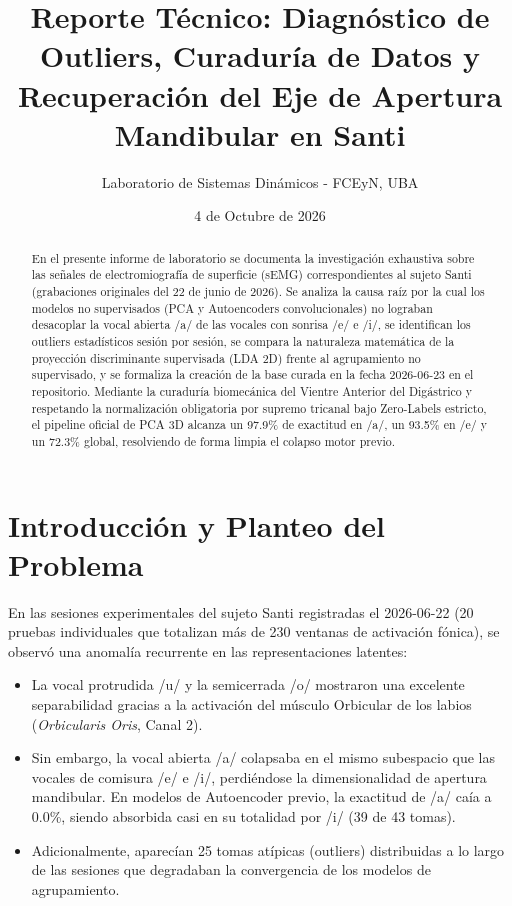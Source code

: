 \documentclass[11pt,a4paper]{article}
\title{\textbf{Reporte Técnico: Diagnóstico de Outliers, Curaduría de Datos y Recuperación del Eje de Apertura Mandibular en Santi}}
\author{Laboratorio de Sistemas Dinámicos - FCEyN, UBA}
\date{4 de Octubre de 2026}
\begin{document}
\maketitle

\begin{abstract}
En el presente informe de laboratorio se documenta la investigación exhaustiva sobre las señales de electromiografía de superficie (sEMG) correspondientes al sujeto Santi (grabaciones originales del 22 de junio de 2026). Se analiza la causa raíz por la cual los modelos no supervisados (PCA y Autoencoders convolucionales) no lograban desacoplar la vocal abierta /a/ de las vocales con sonrisa /e/ e /i/, se identifican los outliers estadísticos sesión por sesión, se compara la naturaleza matemática de la proyección discriminante supervisada (LDA 2D) frente al agrupamiento no supervisado, y se formaliza la creación de la base curada en la fecha 2026-06-23 en el repositorio. Mediante la curaduría biomecánica del Vientre Anterior del Digástrico y respetando la normalización obligatoria por supremo tricanal bajo Zero-Labels estricto, el pipeline oficial de PCA 3D alcanza un 97.9\% de exactitud en /a/, un 93.5\% en /e/ y un 72.3\% global, resolviendo de forma limpia el colapso motor previo.
\end{abstract}

\vspace{0.5cm}
\tableofcontents
\newpage

\section{Introducción y Planteo del Problema}

En las sesiones experimentales del sujeto Santi registradas el 2026-06-22 (20 pruebas individuales que totalizan más de 230 ventanas de activación fónica), se observó una anomalía recurrente en las representaciones latentes:
\begin{itemize}
    \item La vocal protrudida /u/ y la semicerrada /o/ mostraron una excelente separabilidad gracias a la activación del músculo Orbicular de los labios (\textit{Orbicularis Oris}, Canal 2).
    \item Sin embargo, la vocal abierta /a/ colapsaba en el mismo subespacio que las vocales de comisura /e/ e /i/, perdiéndose la dimensionalidad de apertura mandibular. En modelos de Autoencoder previo, la exactitud de /a/ caía a 0.0\%, siendo absorbida casi en su totalidad por /i/ (39 de 43 tomas).
    \item Adicionalmente, aparecían 25 tomas atípicas (outliers) distribuidas a lo largo de las sesiones que degradaban la convergencia de los modelos de agrupamiento.
\end{itemize}
\end{document}
